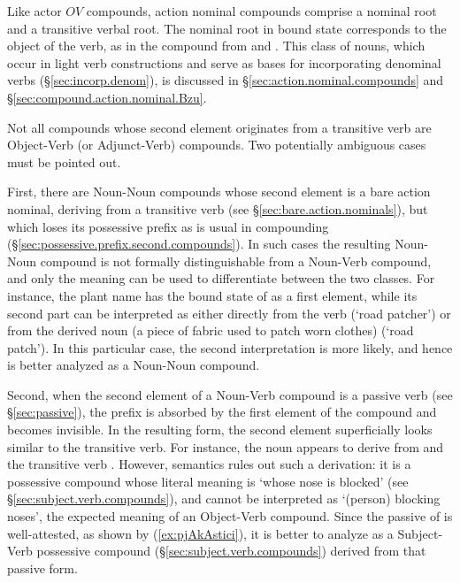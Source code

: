 Like actor $OV$ compounds, action nominal compounds comprise a nominal root and a transitive verbal root. The nominal root in bound state corresponds to the object of the verb, as in the compound  from  and . This class of nouns, which occur in light verb constructions and serve as bases for incorporating denominal verbs (§\ref{sec:incorp.denom}), is discussed in §\ref{sec:action.nominal.compounds} and §\ref{sec:compound.action.nominal.Bzu}. 

Not all compounds whose second element originates from a transitive verb are Object-Verb (or Adjunct-Verb) compounds. Two potentially ambiguous cases must be pointed out. 

First, there are Noun-Noun compounds whose second element is a bare action nominal, deriving from a transitive verb (see §\ref{sec:bare.action.nominals}), but which loses its possessive prefix as is usual in compounding (§\ref{sec:possessive.prefix.second.compounds}). In such cases the resulting Noun-Noun compound is not formally distinguishable from a Noun-Verb compound, and only the meaning can be used to differentiate between the two classes. For instance, the plant name  has the bound state of  as a first element, while its second part  can be interpreted as either directly from the verb  (`road patcher') or from the derived noun  (a piece of fabric used to patch worn clothes) (`road patch'). In this particular case, the second interpretation is more likely, and hence  is better analyzed as a Noun-Noun compound.
 
Second, when the second element of a Noun-Verb compound is a  passive verb (see §\ref{sec:passive}), the  prefix is absorbed by the first element of the compound and becomes invisible. In the resulting form, the second element superficially looks similar to the transitive verb. For instance, the noun  appears to derive from  and the transitive verb . However, semantics rules out such a derivation: it is a possessive compound whose literal meaning is `whose nose is blocked' (see §\ref{sec:subject.verb.compounds}), and cannot be interpreted as `(person) blocking noses', the expected meaning of an Object-Verb compound. Since the passive  of  is well-attested, as shown by (\ref{ex:pjAkAstici}), it is better to analyze  as a Subject-Verb possessive compound (§\ref{sec:subject.verb.compounds}) derived from that passive form.
 
